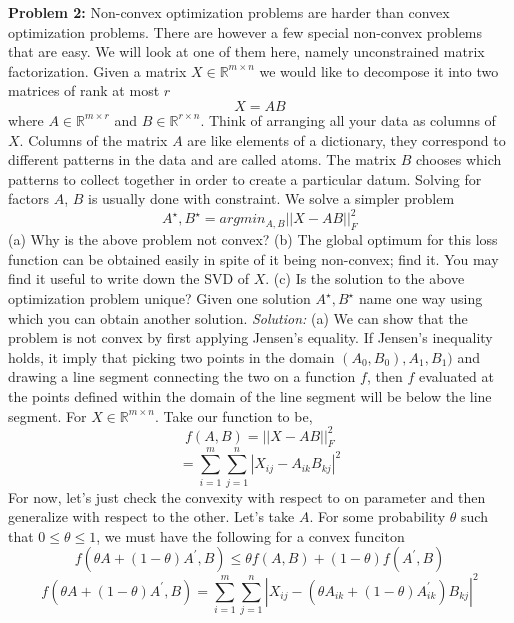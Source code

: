 \documentclass[12pt]{article}
\begin{document}
\textbf{Problem 2:}  \newline 
Non-convex optimization problems are harder than convex optimization problems. There are however a few special non-convex problems that are easy. We will look at one of them here, namely unconstrained matrix factorization. Given a matrix
$X \in \mathbb{R}^{ m\times n} $ we would like to decompose it into two matrices of rank at most $r$ 
$$X = AB$$
where $A \in \mathbb{R}^{m\times r}$ and  $B \in \mathbb{R}^{r\times n}$. Think of arranging all your data as columns of $X$.  
Columns of the matrix $A$ are like elements of a dictionary, they correspond to different patterns in the data and are called atoms. The matrix $B$ chooses which patterns to collect together in order to create a  particular datum. Solving for factors $A$, $B$ is usually done with constraint.  We solve a simpler problem 
$$A^{\star}, B^{\star} = argmin_{A , B }  ||X - AB||_{F}^{2}    $$ 
(a)  Why is the above problem not convex? \newline 
(b) The global optimum for this loss function can be obtained easily in spite of it being non-convex; find it. You may find it useful to write down the SVD of $X$. \newline 
(c)  Is the solution to the above optimization problem unique? Given one solution $A^{\star}, B^{\star}$  name one way using which you can obtain another solution. \newline \newline 
\emph{Solution: } \newline   \newline 
(a) We can show that the problem is not convex by first applying Jensen's equality. If Jensen's inequality holds, it imply that  picking two points in the domain $(A_0, B_0) , A_1, B_1)$ and drawing a line segment connecting the two on a function $f$, then $f$ evaluated at the points defined within the domain of the line segment will be below the line segment.  For $X \in \mathbb{R}^{m\times n}$. Take our function to be, 
$$ f(A, B)  =  ||X - AB||_{F}^{2}  $$ 
$$ =  \sum_{i=1}^{m}   \sum_{j=1}^{n}   |X_{ij} - A_{ik}B_{kj}   |^{2}  $$
For now, let's just check the convexity with respect to on parameter and then generalize with respect to the other. Let's take $A$.  For some probability $\theta$ such that $0 \leq \theta \leq 1$, we must have the following for a convex funciton
$$ f(\theta A + (1-\theta) A^{\prime}, B)  \leq   \theta f( A, B) +  (1-\theta ) f(A^{\prime} , B)   $$
$$f(\theta A + (1-\theta) A^{\prime}, B)   = \sum_{i=1}^{m}   \sum_{j=1}^{n}   |X_{ij} - ( \theta A_{ik}  + (1-\theta) A^{\prime}_{ik} ) B_{kj}  |^{2}      $$
\end{document}
